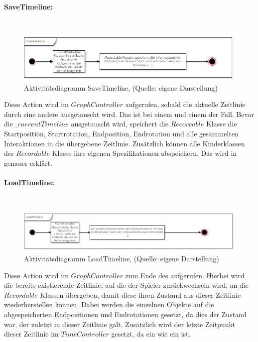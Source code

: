 \paragraph{SaveTimeline:}
~
\begin{figure}[ht]
\centering
\includegraphics[width=1\linewidth]{content/pictures/SaveTImeline_uml.jpg}
\caption{Aktivitätsdiagramm SaveTimeline, (Quelle: eigene Darstellung)}
\label{fig:save_timeline-cs}
\end{figure}

Diese Action wird im $GraphController$ aufgerufen, sobald die aktuelle Zeitlinie durch eine andere ausgetauscht wird. Das ist bei einem  und einem  der Fall. Bevor die $\_currentTimeline$ ausgetauscht wird, speichert die $Recorcable$ Klasse die Startposition, Startrotation, Endposition, Endrotation und alle gesammelten Interaktionen in die übergebene Zeitlinie. Zusätzlich können alle Kinderklassen der $Recordable$ Klasse ihre eigenen Spezifikationen abspeichern. Das wird in  genauer erklärt.

\paragraph{LoadTimeline:}
~
\begin{figure}[ht]
\centering
\includegraphics[width=1\linewidth]{content/pictures/LoadTimeline_uml.jpg}
\caption{Aktivitätsdiagramm LoadTimeline, (Quelle: eigene Darstellung)}
\label{fig:load_timeline-cs}
\end{figure}

Diese Action wird im $GraphController$ zum Ende des  aufgerufen. Hierbei wird die bereits existierende Zeitlinie, auf die der Spieler zurückwechseln wird, an die $Recordable$ Klassen übergeben, damit diese ihren Zustand aus dieser Zeitlinie wiederherstellen können. Dabei werden die einzelnen Objekte auf die abgespeicherten Endpositionen und Endrotationen gesetzt, da dies der Zustand war, der zuletzt in dieser Zeitlinie galt. 
Zusätzlich wird der letzte Zeitpunkt dieser Zeitlinie im $TimeController$ gesetzt, da ein  wie ein  ist.

